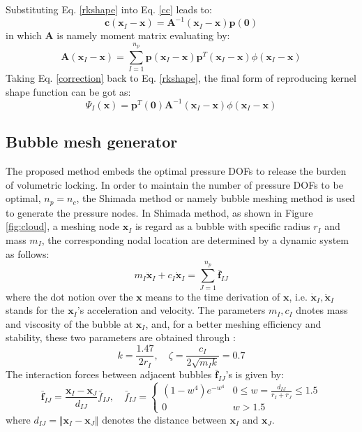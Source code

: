 Substituting Eq. \ref{rkshape} into Eq. \ref{cc} leads to:
\begin{equation}\label{correction}
\boldsymbol c(\boldsymbol x_I-\boldsymbol x) = \boldsymbol A^{-1}(\boldsymbol x_I-\boldsymbol x)\boldsymbol p(\boldsymbol 0)
\end{equation}
in which $\boldsymbol A$ is namely moment matrix evaluating by:
\begin{equation}
\boldsymbol A(\boldsymbol x_I-\boldsymbol x) = \sum_{I=1}^{n_p}\boldsymbol p(\boldsymbol x_I-\boldsymbol x) \boldsymbol p^T(\boldsymbol x_I-\boldsymbol x)\phi(\boldsymbol x_I-\boldsymbol x)
\end{equation}
Taking Eq. \eqref{correction} back to Eq. \eqref{rkshape}, the final form of reproducing kernel shape function can be got as:
\begin{equation}
\Psi_I(\boldsymbol x) = \boldsymbol p^T(\boldsymbol 0) \boldsymbol A^{-1}(\boldsymbol x_I-\boldsymbol x)\phi(\boldsymbol x_I-\boldsymbol x)
\end{equation}

\subsection{Bubble mesh generator}
The proposed method embeds the optimal pressure DOFs to release the burden of volumetric locking. In order to maintain the number of pressure DOFs to be optimal, $n_p=n_c$, the Shimada method or namely bubble meshing method \cite{deberg2008} is used to generate the pressure nodes. 
In Shimada method, as shown in Figure \ref{fig:cloud}, a meshing node $\boldsymbol x_I$ is regard as a bubble with specific radius $r_I$ and mass $m_I$, the corresponding nodal location are determined by a dynamic system as follows:
\begin{equation} \label{bubble1}
    m_I \ddot{\boldsymbol x}_{I} + c_I \dot{\boldsymbol x}_I = \sum_{J=1}^{n_p} \bar{\boldsymbol f}_{IJ}
\end{equation}
where the dot notion over the $\boldsymbol x$ means to the time derivation of $\boldsymbol x$, i.e. $\dot{\boldsymbol x}_I, \ddot{\boldsymbol x}_I$ stands for the $\boldsymbol x_I$'s acceleration and velocity. 
The parameters $m_I, c_I$ dnotes mass and viscosity of the bubble at $\boldsymbol x_I$, and, for a better meshing efficiency and stability, these two parameters are obtained through \cite{dinh2017}:
\begin{equation} \label{bubble2}
    k = \frac{1.47}{2r_I}, \quad \zeta = \frac{c_I}{2\sqrt{m_I k}} = 0.7
\end{equation}
The interaction forces between adjacent bubbles $\bar{\boldsymbol f}_{IJ}$'s is given by:
\begin{equation}
\bar{\boldsymbol f}_{IJ} = \frac{\boldsymbol x_I - \boldsymbol x_J}{d_{IJ}} \bar f_{IJ}, \quad
\bar f_{IJ} =
\begin{cases}
    (1-w^4) e^{-w^4} & 0\le w= \frac{d_{IJ}}{r_I+r_J} \le 1.5 \\
    0 & w>1.5
\end{cases}
\end{equation}
where $d_{IJ} = \Vert \boldsymbol x_I - \boldsymbol x_J \Vert$ denotes the distance between $\boldsymbol x_I$ and $\boldsymbol x_J$.

